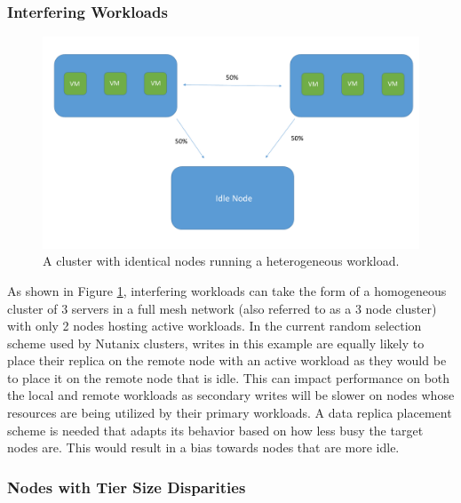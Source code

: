 \documentclass[12pt]{article}
\begin{document}
    \subsubsection{Interfering Workloads}

    \begin{figure}[htbp]
      \centering
      \includegraphics[scale=0.45]{images/homogeneous_workload_disparity.pdf} 
      \caption{A cluster with identical nodes running a heterogeneous workload.}
      \label{fig:workload_disparity}
    \end{figure}

    As shown in Figure \ref{fig:workload_disparity}, interfering workloads can
    take the form of a homogeneous cluster of 3 servers in a full mesh network
    (also referred to as a 3 node cluster) with only 2 nodes hosting active
    workloads. In the current random selection scheme used by Nutanix
    clusters, writes in this example are equally likely to place their replica
    on the remote node with an active workload as they would be to place it on
    the remote node that is idle.  This can impact performance on both the
    local and remote workloads as secondary writes will be slower on nodes
    whose resources are being utilized by their primary workloads. A data replica
    placement scheme is needed that adapts its behavior based on how less busy
    the target nodes are. This would result in a bias towards nodes that are
    more idle.

    \subsubsection{Nodes with Tier Size Disparities}
\end{document}
